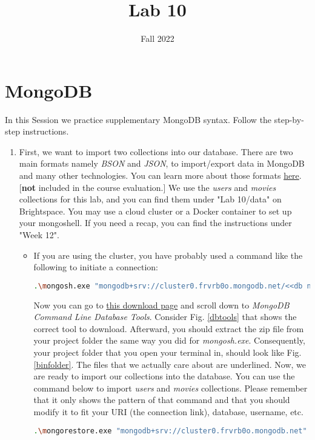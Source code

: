 \documentclass{homework}
\author{}
\date{Fall 2022}
\title{Lab 10}
\begin{document}
 \maketitle

\section*{MongoDB}
In this Session we practice supplementary MongoDB syntax. Follow the step-by-step instructions.
\begin{enumerate}[label=\roman*)]
    \item First, we want to import two collections into our database. There are two main formats namely \textit{BSON} and \textit{JSON}, to import/export data in MongoDB and many other technologies. You can learn more about those formats \href{https://www.mongodb.com/basics/bson}{here}. [\textbf{not} included in the course evaluation.]
    We use the \textit{users} and \textit{movies} collections for this lab, and you can find them under "Lab 10/data" on Brightspace.
    You may use a cloud cluster or a Docker container to set up your mongoshell. If you need a recap, you can find the instructions under "Week 12".
    \begin{itemize}
        \item If you are using the cluster, you have probably used a command like the following to initiate a connection:
\begin{lstlisting}[language=bash]
.\mongosh.exe "mongodb+srv://cluster0.frvrb0o.mongodb.net/<<db name>>" --apiVersion 1 --username <<user name>>             
\end{lstlisting}
    Now you can go to \href{https://www.mongodb.com/try/download/database-tools}{this download page} and scroll down to \textit{MongoDB Command Line Database Tools}. Consider Fig. \ref{dbtools} that shows the correct tool to download.
    Afterward, you should extract the zip file from your project folder the same way you did for \textit{mongosh.exe}. Consequently, your project folder that you open your terminal in, should look like Fig. \ref{binfolder}. The files that we actually care about are underlined. 
    Now, we are ready to import our collections into the database. You can use the command below to import \textit{users} and \textit{movies} collections. Please remember that it only shows the pattern of that command and that you should modify it to fit your URI (the connection link), database, username, etc.
    \begin{lstlisting}[language=bash]
.\mongorestore.exe "mongodb+srv://cluster0.frvrb0o.mongodb.net" --username admin --drop -d "Bit" -c "movies" .\movies.bson
\end{lstlisting}


\end{itemize}
\end{enumerate}
\end{document}
